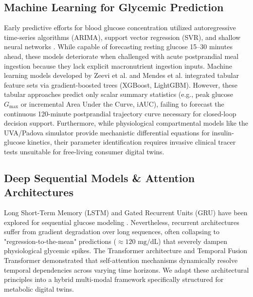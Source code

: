 \documentclass[conference]{IEEEtran}
\begin{document}
\subsection{Machine Learning for Glycemic Prediction}
Early predictive efforts for blood glucose concentration utilized autoregressive time-series algorithms (ARIMA), support vector regression (SVR), and shallow neural networks \cite{georga2013evaluating, zhu2021deep}. While capable of forecasting resting glucose 15--30 minutes ahead, these models deteriorate when challenged with acute postprandial meal ingestion because they lack explicit macronutrient ingestion inputs. Machine learning models developed by Zeevi et al. \cite{zeevi2015personalized} and Mendes et al. \cite{mendes2024cgmacros} integrated tabular feature sets via gradient-boosted trees (XGBoost, LightGBM). However, these tabular approaches predict only scalar summary statistics (e.g., peak glucose $G_{\max}$ or incremental Area Under the Curve, iAUC), failing to forecast the continuous 120-minute postprandial trajectory curve necessary for closed-loop decision support. Furthermore, while physiological compartmental models like the UVA/Padova simulator \cite{cobelli2011uva} provide mechanistic differential equations for insulin-glucose kinetics, their parameter identification requires invasive clinical tracer tests unsuitable for free-living consumer digital twins.

\subsection{Deep Sequential Models \& Attention Architectures}
Long Short-Term Memory (LSTM) and Gated Recurrent Units (GRU) have been explored for sequential glucose modeling \cite{mirshekarian2019using, martinsson2020blood}. Nevertheless, recurrent architectures suffer from gradient degradation over long sequences, often collapsing to "regression-to-the-mean" predictions ($\approx 120\text{ mg/dL}$) that severely dampen physiological glycemic spikes. The Transformer architecture \cite{vaswani2017attention} and Temporal Fusion Transformer \cite{lim2021temporal} demonstrated that self-attention mechanisms dynamically resolve temporal dependencies across varying time horizons. We adapt these architectural principles into a hybrid multi-modal framework specifically structured for metabolic digital twins.
\end{document}
